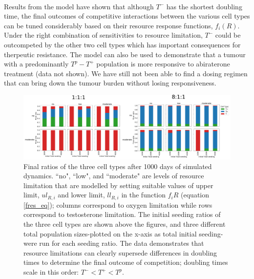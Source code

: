 \documentclass[12pt,onecolumn,twoside]{article}
\begin{document}
	\paragraph{\empty}Results from the model have shown that although $T^-$ has the shortest doubling time, the final outcomes of competitive interactions between the various cell types can be tuned considerably based on their resource response functions, $f_i(R)$. Under the right combination of sensitivities to resource limitation, $T^-$ could be outcompeted by the other two cell types which has important consequences for therpeutic resistance. The model can also be used to demonstrate that a tumour with a predominantly $T^p-T^+$ population is more responsive to abiraterone treatment (data not shown). We have still not been able to find a dosing regimen that can bring down the tumour burden without losing responsiveness.
	\begin{figure}
	\centering
		\includegraphics[width=\textwidth]{fig2}
		\caption{\small Final ratios of the three cell types after 1000 days of simulated dynamics. ``no", ``low", and ``moderate" are levels of resource limitation that are modelled by setting suitable values of upper limit, $ul_{R,i}$ and lower limit, $ll_{R,i}$ in the function $f_i{R}$ (equation \ref{fres_eq}); columns correspond to oxygen limitation while rows correspond to testosterone limitation. The initial seeding ratios of the three cell types are shown above the figures, and three different total population sizes-plotted on the x-axis as total initial seeding-were run for each seeding ratio. The data demonstrates that resource limitations can clearly supersede differences in doubling times to determine the final outcome of competition; doubling times scale in this order: $T^- < T^+ < T^p$.}
	\end{figure}
\end{document}
